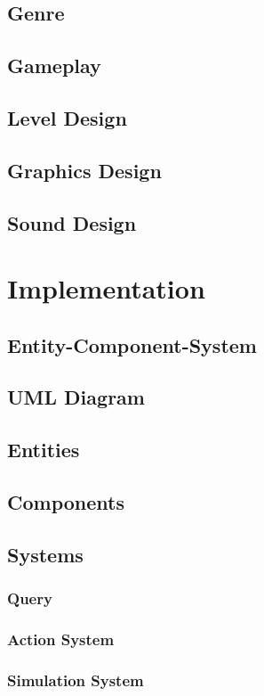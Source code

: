 \documentclass[11pt]{article}
\begin{document}
    \subsection{Genre}
    \subsection{Gameplay}
    \subsection{Level Design}
    \subsection{Graphics Design}
    \subsection{Sound Design}
    \section{Implementation}
    \subsection{Entity-Component-System}
    \subsection{UML Diagram}
    \subsection{Entities}
    \subsection{Components}
    \subsection{Systems}
    \subsubsection{Query}
    \subsubsection{Action System}
    \subsubsection{Simulation System}
\end{document}
